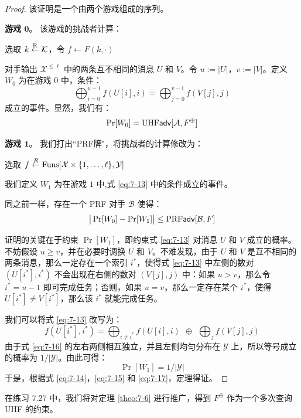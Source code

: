 \begin{proof}
该证明是一个由两个游戏组成的序列。

\vspace{5pt}

\noindent\textbf{游戏 $\mathbf{0}$}。
该游戏的挑战者计算：

\vspace{5pt}

\hspace*{5pt} 选取 $k\overset{\rm R}\leftarrow\mathcal{K}$，令 $f\leftarrow F(k,\cdot)$

\vspace{5pt}

\noindent
对手输出 $\mathcal{X}^{\leq\ell}$ 中的两条互不相同的消息 $U$ 和 $V$。令 $u:=|U|$，$v:=|V|$。定义 $W_0$ 为在游戏 $0$ 中，条件：
\begin{equation}\label{eq:7-13}
\bigoplus_{i=0}^{u-1}f(U[i],i)=\bigoplus_{j=0}^{v-1}f(V[j],j)
\end{equation}
成立的事件。显然，我们有：
\begin{equation}\label{eq:7-14}
\Pr[W_0]={\rm UHF}\mathsf{adv}[\mathcal{A},F^\oplus]
\end{equation}

\noindent\textbf{游戏 $\mathbf{1}$}。
我们打出``PRF牌"，将挑战者的计算修改为：

\vspace{5pt}

\hspace*{5pt} 选取 $f\overset{R}\leftarrow{\rm Funs}[\mathcal{X}\times\{1,\dots,\ell\},\mathcal{Y}]$

\vspace{5pt}

\noindent
我们定义 $W_1$ 为在游戏 $1$ 中,式 \ref{eq:7-13} 中的条件成立的事件。

同之前一样，存在一个 PRF 对手 $\mathcal{B}$ 使得：
\begin{equation}\label{eq:7-15}
\big\lvert\Pr[W_0]-\Pr[W_1]\big\rvert\leq{\rm PRF}\mathsf{adv}[\mathcal{B},F]
\end{equation}

\noindent
证明的关键在于约束 $\Pr[W_1]$，即约束式 \ref{eq:7-13} 对消息 $U$ 和 $V$ 成立的概率。不妨假设 $u\geq v$，并在必要时调换 $U$ 和 $V$。不难发现，由于 $U$ 和 $V$ 是互不相同的两条消息，那么一定存在一个索引 $i^*$，使得式 \ref{eq:7-13} 中左侧的数对 $(U[i^*],i^*)$ 不会出现在右侧的数对 $(V[j],j)$ 中：如果 $u>v$，那么令 $i^*=u-1$ 即可完成任务；否则，如果 $u=v$，那么一定存在某个 $i^*$，使得 $U[i^*]\neq V[i^*]$，那么该 $i^*$ 就能完成任务。

我们可以将式 \ref{eq:7-13} 改写为：
\begin{equation}\label{eq:7-16}
f(U[i^*],i^*)=\bigoplus_{i\neq i^*}f(U[i],i)\ \ \oplus\ \ \bigoplus_jf(V[j],j)
\end{equation}
由于式 \ref{eq:7-16} 的左右两侧相互独立，并且左侧均匀分布在 $\mathcal{Y}$ 上，所以等号成立的概率为 ${1}/{|\mathcal{Y}|}$。由此可得：
\begin{equation}\label{eq:7-17}
\Pr[W_1]={1}/{|\mathcal{Y}|}
\end{equation}
于是，根据式 \ref{eq:7-14}，\ref{eq:7-15} 和 \ref{eq:7-17}，定理得证。
\end{proof}

在练习 7.27 中，我们将对定理 \ref{theo:7-6} 进行推广，得到 $F^\oplus$ 作为一个多次查询 UHF 的约束。